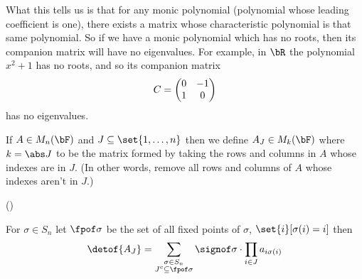 What this tells us is that for any monic polynomial (polynomial whose leading coefficient is one), there exists a matrix whose characteristic polynomial is that same polynomial.
So if we have a monic polynomial which has no roots, then its companion matrix will have no eigenvalues.
For example, in $\bR$ the polynomial $x^2+1$ has no roots, and so its companion matrix
\[ C = \begin{pmatrix}0 & -1 \\ 1 & 0\end{pmatrix} \]
has no eigenvalues.

\begin{defn*}

    If $A\in M_n(\bF)$ and $J\subseteq\set{1,\dots,n}$ then we define $A_J\in M_k(\bF)$ where $k=\abs J$ to be the matrix formed by taking the rows and columns in $A$ whose indexes are in $J$.
    (In other words, remove all rows and columns of $A$ whose indexes aren't in $J$.)

\end{defn*}

({})
\begin{lemm*}

    For $\sigma\in S_n$ let $\fpof\sigma$ be the set of all fixed points of $\sigma$, $\set{i}[\sigma(i)=i]$ then
    \[ \detof{A_J} = \sum_{\substack{\sigma\in S_n\\J^c\subseteq\fpof\sigma}}\signof\sigma\cdot\prod_{i\in J}a_{i\sigma(i)} \]

\end{lemm*}

